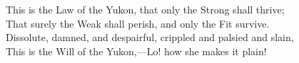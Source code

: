 \begin{adjustwidth}{0em}{0em}
\begin{poemblock}
This is the Law of the Yukon, that only the Strong shall thrive;\\
That surely the Weak shall perish, and only the Fit survive.\\
Dissolute, damned, and despairful, crippled and palsied and slain,\\
This is the Will of the Yukon,—Lo! how she makes it plain!\\
\end{poemblock}
\end{adjustwidth}

